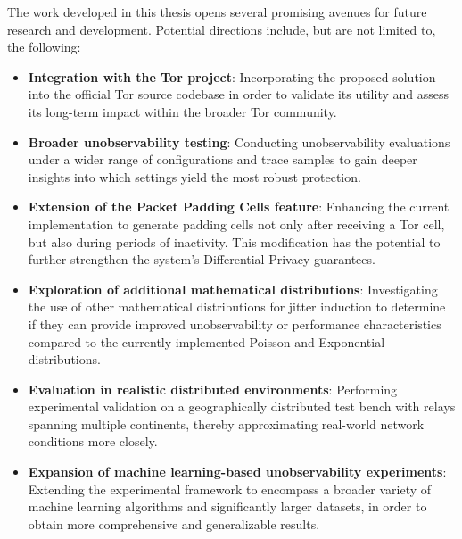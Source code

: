 The work developed in this thesis opens several promising avenues for future research and development. Potential directions include, but are not limited to, the following:
\begin{itemize}
    \item \textbf{Integration with the Tor project}: Incorporating the proposed solution into the official Tor source codebase in order to validate its utility and assess its long-term impact within the broader Tor community.
    \item \textbf{Broader unobservability testing}: Conducting unobservability evaluations under a wider range of configurations and trace samples to gain deeper insights into which settings yield the most robust protection.
    \item \textbf{Extension of the Packet Padding Cells feature}: Enhancing the current implementation to generate padding cells not only after receiving a Tor cell, but also during periods of inactivity. This modification has the potential to further strengthen the system's Differential Privacy guarantees.
    \item \textbf{Exploration of additional mathematical distributions}: Investigating the use of other mathematical distributions for jitter induction to determine if they can provide improved unobservability or performance characteristics compared to the currently implemented Poisson and Exponential distributions.
    \item \textbf{Evaluation in realistic distributed environments}: Performing experimental validation on a geographically distributed test bench with relays spanning multiple continents, thereby approximating real-world network conditions more closely.
    \item \textbf{Expansion of machine learning-based unobservability experiments}: Extending the experimental framework to encompass a broader variety of machine learning algorithms and significantly larger datasets, in order to obtain more comprehensive and generalizable results.
\end{itemize}